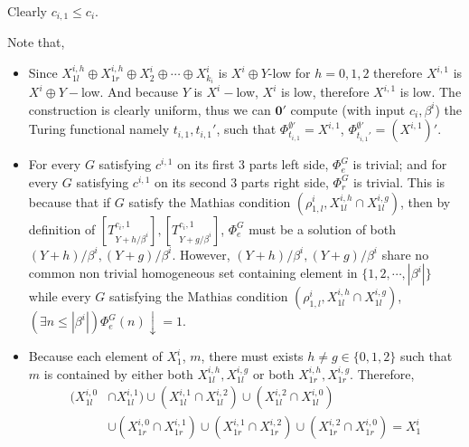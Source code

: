 \documentclass[options]{amsart}
\theoremstyle{definition}
\theoremstyle{remark}
\newtheorem{Ramsey's theorem}[theorem]{Ramsey's theorem}
\begin{document}
Clearly $c_{i,1}\leq c_i$.

Note that,
\begin{itemize}
\item
Since $X^{i,h}_{1l}
\oplus X^{i,h}_{1r}
\oplus X^{i}_{2}\oplus \cdots
\oplus X^i_{k_i}$ is $X^i\oplus Y$-low
for $h=0,1,2$ therefore
$X^{i,1}$ is $X^i\oplus Y-$low.
 And because
$Y$ is $X^i-$low,
$X^i$ is low, therefore
$X^{i,1}$ is low. The construction
is clearly uniform, thus
we can $\mathbf{0}'$ compute
(with input $c_i,\beta^i$)
the Turing functional namely
$t_{i,1},t_{i,1}'$, such that
$\Phi_{t_{i,1}}^{\emptyset'}
=X^{i,1}$, $\Phi_{t_{i,1}'}^
{\emptyset'}=(X^{i,1 })'$.

\item
For every $G$ satisfying
$c^{i,1}$  on its first
$3$ parts left side, $\Phi_e^G$
is trivial;
and for every
$G$ satisfying $c^{i,1}$
on its second $3$ parts right side,
$\Phi_r^G$ is trivial.
This is because that
if $G$ satisfy the Mathias condition
$(\rho^i_{1,l}, X^{i,h}_{1l}\cap
X^{i,g}_{1l})$, then
by definition of
$[T^{c_i,1}_{Y+h/\beta^i}],
[T^{c_i,1}_{Y+g/\beta^i}]$,
$\Phi_e^G$ must be a solution of
both $(Y+h)/\beta^i, (Y+g)/\beta^i$.
 However, $(Y+h)/\beta^i, (Y+g)/\beta^i$ share
no common non trivial homogeneous set
containing element
in $\{1,2,\cdots,|\beta^i|\}$ while
every $G$ satisfying the Mathias condition
$(\rho^i_{1,l}, X^{i,h}_{1l}\cap
X^{i,g}_{1l})$, 
$(\exists n\leq |\beta^i|)
\Phi_e^G(n)\downarrow = 1$.

\item
Because each element of $X^i_1$,
$m$, there must exists
$h\ne g\in \{0,1,2\}$ such that
$m$ is contained by either both
$X^{i,h}_{1l},X^{i,g}_{1l}$
or both
$X^{i,h}_{1r},X^{i,g}_{1r}$.
Therefore,
\begin{align}\label{RT21arg1}
(X^{i,0}_{1l}&\cap
X^{i,1}_{1l})
\cup
(X^{i,1}_{1l}\cap
X^{i,2}_{1l})
\cup
(X^{i,2}_{1l}\cap
X^{i,0}_{1l})\\ \nonumber
&\cup
(X^{i,0}_{1r}\cap
X^{i,1}_{1r})
\cup
(X^{i,1}_{1r}\cap
X^{i,2}_{1r})
\cup
(X^{i,2}_{1r}\cap
X^{i,0}_{1r})= X^i_1
\end{align}

\end{itemize}
\end{document}
